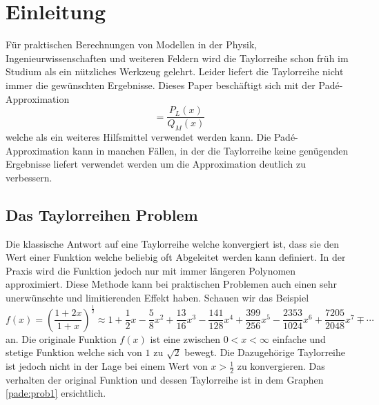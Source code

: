 %
%
%
\section{Einleitung\label{pade:section:einleitung}}
Für praktischen Berechnungen von Modellen in der Physik, Ingenieurwissenschaften und weiteren Feldern wird die Taylorreihe schon früh im Studium als ein nützliches Werkzeug gelehrt.
Leider liefert die Taylorreihe nicht immer die gewünschten Ergebnisse.
Dieses Paper beschäftigt sich mit der Padé-Approximation 
\begin{equation*}
[L/M]
=
\frac{P_{L}(x)}{Q_{M}(x)}
\end{equation*}
welche als ein weiteres Hilfsmittel verwendet werden kann.
Die Padé-Approximation kann in manchen Fällen, in der die Taylorreihe keine genügenden Ergebnisse liefert verwendet werden um die Approximation deutlich zu verbessern.

 

\subsection{Das Taylorreihen Problem
\label{pade:Taylorfehler}}

Die klassische Antwort auf eine Taylorreihe welche konvergiert ist, dass sie den Wert einer Funktion welche beliebig oft Abgeleitet werden kann definiert. 
In der Praxis wird die Funktion jedoch nur mit immer längeren Polynomen approximiert.
Diese Methode kann bei praktischen Problemen auch einen sehr unerwünschte und limitierenden Effekt haben. 
Schauen wir das Beispiel 
\begin{equation*}
f(x)
=
\left(\frac{1+2x}{1+x}\right)^{\frac{1}{2}}
\approx
1+\frac{1}{2}x - \frac{5}{8}x^2+\frac{13}{16}x^3 -\frac{141}{128}x^4 +\frac{399}{256}x^5 - \frac{2353}{1024}x^6 + \frac{7205}{2048}x^7 \mp \cdots
\end{equation*}
an. 
Die originale Funktion $f(x)$ ist eine zwischen $0<x<\infty$ einfache und stetige Funktion welche sich von $1$ zu $\sqrt{2}$ bewegt.
Die Dazugehörige Taylorreihe ist jedoch nicht in der Lage bei einem Wert von $x>\frac{1}{2}$ zu konvergieren. 
Das verhalten der original Funktion und dessen Taylorreihe ist in dem Graphen \ref{pade:prob1} ersichtlich. 

